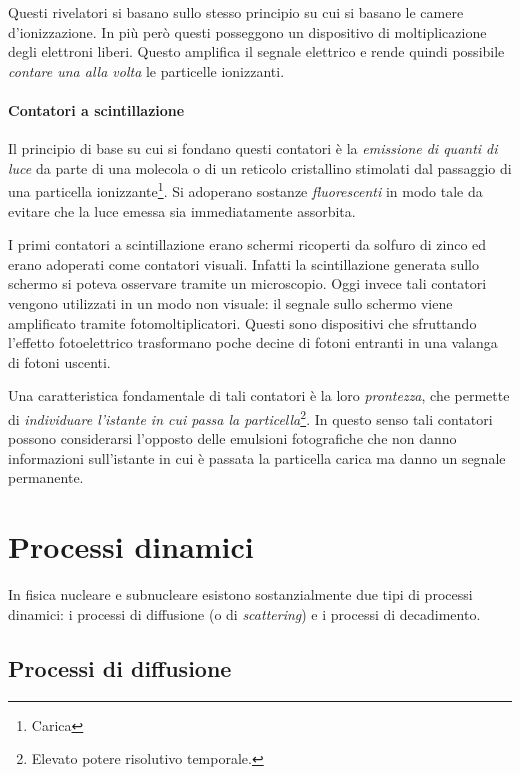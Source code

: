 Questi rivelatori si basano sullo stesso principio su cui si basano le camere d'ionizzazione. In più però questi posseggono un dispositivo di moltiplicazione degli elettroni liberi. Questo amplifica il segnale elettrico e rende quindi possibile \textit{contare una alla volta} le particelle ionizzanti.

\subsubsection{Contatori a scintillazione}

Il principio di base su cui si fondano questi contatori è la \textit{emissione di quanti di luce} da parte di una molecola o di un reticolo cristallino stimolati dal passaggio di una particella ionizzante\footnote{Carica }. Si adoperano sostanze \textit{fluorescenti} in modo tale da evitare che la luce emessa sia immediatamente assorbita.

I primi contatori a scintillazione erano schermi ricoperti da solfuro di zinco ed erano adoperati come contatori visuali. Infatti la scintillazione generata sullo schermo si poteva osservare tramite un microscopio. Oggi invece tali contatori vengono utilizzati in un modo non visuale: il segnale sullo schermo viene amplificato tramite fotomoltiplicatori. Questi sono dispositivi che sfruttando l'effetto fotoelettrico trasformano poche decine di fotoni entranti in una valanga di fotoni uscenti.

Una caratteristica fondamentale di tali contatori è la loro \textit{prontezza}, che permette di \textit{individuare l'istante in cui passa la particella}\footnote{Elevato potere risolutivo temporale. }. In questo senso tali contatori possono considerarsi l'opposto delle emulsioni fotografiche che non danno informazioni sull'istante in cui è passata la particella carica ma danno un segnale permanente.

\chapter{Processi dinamici}

In fisica nucleare e subnucleare esistono sostanzialmente
due tipi di processi dinamici: i processi di diffusione (o di
\textit{scattering}) e i processi di decadimento.

\section{Processi di diffusione}

